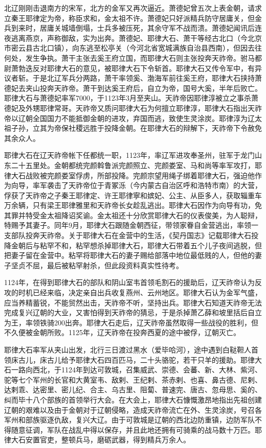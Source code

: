 北辽刚刚击退南方的宋军，北方的金军又再次逼近。萧德妃曾五次上表金朝，请求立秦王耶律定为帝，称臣求和，金太祖不许。萧德妃只好派精兵防守居庸关，但金兵到来时，居庸关城墙倒塌，士兵多被压死，其余守军不战而溃。萧德妃闻讯后连夜逃离燕京，声称御敌，实为出奔。萧德妃、耶律大石、萧干等经古北口（今北京市密云县古北口镇），向东逃至松亭关（今河北省宽城满族自治县西南），但因去往何处，发生争执。萧干主张去奚王府立国，而耶律大石则主张投奔天祚帝。驸马都尉萧勃迭反对耶律大石的意见，被耶律大石下令斩首。耶律大石又传令军中，有异议者斩。于是北辽军兵分两路，萧干率领奚、渤海军前往奚王府，耶律大石挟持萧德妃去夹山投奔天祚帝。萧干到达奚王府后，自立为帝，国号大奚，半年后败亡。耶律大石与萧德妃率军7000，于1123年3月至夹山。天祚帝因耶律淳被立之事杀萧德妃及外甥耶律常哥。天祚帝又质问耶律大石为何擅立耶律淳，耶律大石指出天祚帝以辽朝全国国力不能抵御金朝的进攻，弃国而逃，致使生灵涂炭。耶律淳为辽太祖子孙，立其为帝保社稷远胜于投降金朝。在耶律大石的辩解下，天祚帝下令赦免其余众人。

耶律大石在辽天祚帝帐下任都统一职，1123年，率辽军进攻奉圣州，驻军于龙门山东二十五里处。金朝都统完颜斡鲁派完颜照立、完颜娄室、马和尚等率军攻打，耶律大石战败被完颜娄室俘虏，所部投降。完颜宗望用绳子绑着耶律大石，强迫他作为向导，率军袭击了天祚帝位于青冢泺（今内蒙古自治区呼和浩特市南）的大营，俘获了天祚帝之子秦王耶律定、许王耶律寧和嫔妃、公主、从臣多人，获取辎重车万余辆，只有梁王耶律雅里和天祚帝长女趁乱逃出。耶律大石因作为向导有功，免其罪并特受金太祖降诏奖谕。金太祖还十分欣赏耶律大石的仪表俊美，为人聪辩，特赐予其妻子。同年9月，耶律大石跟随金朝西征，带领家眷自金营逃出，率领一支部队投奔天祚帝。关于耶律大石在金营中的生活，《契丹国志》记载耶律大石投降金朝后与粘罕不和，粘罕想杀掉耶律大石，耶律大石带着五个儿子夜间逃脱，但把妻子留在金营中。粘罕将耶律大石的妻子赐给部落中地位最低贱的人，但他的妻子坚贞不屈，最后被粘罕射杀，但此段资料真实性待考。

1124年，在得到耶律大石的部队和阴山室韦首领毛割石的援助后，辽天祚帝认为反攻的时机已经来临，决定亲自出兵收复燕州、云州地区。耶律大石认为金军气盛，应当养精蓄锐，不能贸然出击，天祚帝不听，坚持出兵。耶律大石知道天祚帝无法完成复兴辽朝的大业，又害怕得到天祚帝的猜忌，于是杀掉萧乙薛和坡里括后自立为王，率领铁骑200出奔。耶律大石走后，辽天祚帝虽然取得一些战役的胜利，但不久便被金朝所败。1125年，辽天祚帝在投奔西夏的途中被俘，辽朝灭亡。

耶律大石率军从夹山出发，北行三日渡过黑水（爱毕哈河），途中遇到白鞑靼人首领床古儿，床古儿给予耶律大石四百匹马，二十头骆驼，若干只羊的援助。耶律大石一路向西北，于1124年到达可敦城，召集威武、崇德、会蕃、新、大林、紫河、驼等七个军州的长官和大黄室韦、敌剌、王纪剌、茶赤剌、也喜、鼻古德、尼剌、达剌乖、达密里、密儿纪、合主、乌古里、阻蔔、普速完、唐古、忽母思、奚的、纠而毕十八个部族的首领举行大会。在大会上，耶律大石慷慨激昂地指出先祖创建辽朝的艰难以及由于金朝对于辽朝侵略，造成天祚帝流亡在外、生灵涂炭，号召各军州和部族驱逐仇敌，复兴大辽。由于可敦城是辽朝的西北边防重镇，边防军队不得随意征调，军队在战乱中得以保存，并且此地还拥有可骑乘的战马数十万匹。耶律大石安置官吏，整顿兵马，磨砺武器，得到精兵万余人。

